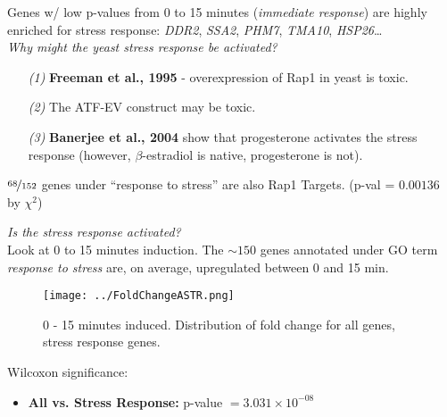 \documentclass{beamer}
\begin{document}

\begin{frame}
    Genes w/ low p-values from 0 to 15 minutes (\emph{immediate response}) are highly enriched for stress response: \emph{DDR2}, \emph{SSA2}, \emph{PHM7}, \emph{TMA10}, \emph{HSP26}\dots\\
    \bigskip
    \pause
    \emph{Why might the yeast stress response be activated?}
    \begin{itemize}
        \item[\emph{(1)}] \textbf{Freeman et al., 1995} - overexpression of Rap1 in yeast is toxic. 
        \item[\emph{(2)}] The ATF-EV construct may be toxic. 
        \item[\emph{(3)}] \textbf{Banerjee et al., 2004} show that progesterone activates the stress response (however, $\beta$-estradiol is native, progesterone is not).
    \end{itemize}

    $\nicefrac{68}{152}$ genes under ``response to stress'' are also Rap1 Targets. (p-val = $0.00136$ by $\chi^2$)
\end{frame}

\begin{frame}
    \emph{Is the stress response activated?}\\

    {\scriptsize Look at 0 to 15 minutes induction. The $ \sim 150$ genes annotated under GO term \emph{response to stress} are, on average, upregulated between 0 and 15 min.}\\
    
    \begin{figure}[ht!]
        \centering
        \texttt{[image: ../FoldChangeASTR.png]}
        \caption{0 - 15 minutes induced. Distribution of fold change for {\color{gray} all genes}, {\color{blue} stress response genes}.}
        \label{fig:targ2}
    \end{figure}

Wilcoxon significance:
    \begin{itemize}
        \item \textbf{All vs. Stress Response:} p-value $= 3.031 \times 10^{-08}$
    \end{itemize}
\end{frame}
\end{document}
